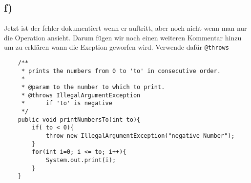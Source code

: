 \subsection*{f)}
	Jetzt ist der fehler dokumentiert wenn er auftritt, aber noch nicht wenn man nur die Operation ansieht. Darum fügen wir noch einen weiteren Kommentar hinzu um zu erklären wann die Exeption geworfen wird. Verwende dafür  \lstinline{@throws}
		 \begin{lstlisting}
	/**
	 * prints the numbers from 0 to 'to' in consecutive order.
	 * 
	 * @param to the number to which to print.
	 * @throws IllegalArgumentException
	 * 		if 'to' is negative
	 */
	public void printNumbersTo(int to){
		if( to < 0){
			throw new IllegalArgumentException("negative Number");	
		}
		for(int i=0; i <= to; i++){
			System.out.print(i);
		}
	}
		\end{lstlisting}
 \
\newpage